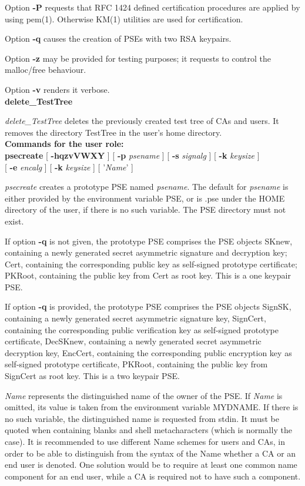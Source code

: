 Option {\bf -P} requests that RFC 1424 defined certification procedures are applied
by using pem(1). Otherwise KM(1) utilities are used for certification.

Option {\bf -q} causes the creation of PSEs with two RSA keypairs.

Option {\bf -z} may be provided for testing purposes; it requests to control the malloc/free behaviour.

Option {\bf -v} renders it verbose. \\ [1em]
{\bf delete\_TestTree}

{\em delete\_TestTree} deletes the previously created test tree of CAs and users. It removes
the directory TestTree in the user's home directory.
\\ [1em] 
{\bf Commands for the user role:} 
\\ [1em]
{\bf psecreate} [ {\bf -hqzvVWXY} ] [ {\bf -p} {\em psename} ]
[ {\bf -s} {\em signalg} ] [ {\bf -k} {\em keysize} ] \\ 
\hspace*{2cm} [ {\bf -e} {\em encalg} ] [ {\bf -k} {\em keysize} ] [ '{\em Name}' ]

{\em psecreate} creates a prototype PSE named {\em psename}. The default for {\em psename} is either
provided by the environment variable PSE, or is .pse under the HOME directory of the user, if there
is no such variable. The PSE directory must not exist.

If option {\bf -q} is not given, the prototype PSE comprises the PSE objects 
\bi
\m SKnew, containing a newly generated secret asymmetric signature and decryption key;
\m Cert, containing the corresponding public key as self-signed prototype certificate;
\m PKRoot, containing the public key from Cert as root key.
\ei
This is a one keypair PSE.
 
If option {\bf -q} is provided, the prototype PSE comprises the PSE objects 
\bi
\m SignSK, containing a newly generated secret asymmetric signature key,
\m SignCert, containing the corresponding public verification key as self-signed prototype certificate,
\m DecSKnew, containing a newly generated secret asymmetric decryption key,
\m EncCert, containing the corresponding public encryption key as self-signed prototype certificate,
\m PKRoot, containing the public key from SignCert as root key.
\ei
This is a two keypair PSE.

{\em Name} represents the distinguished name of the owner of the PSE. 
If {\em Name} is omitted, its value is taken from the environment variable MYDNAME. If there is no
such variable, the distinguished name is requested from 
stdin. 
It must be quoted when containing blanks and shell metacharacters (which is normally the case).
It is recommended to use different Name schemes for users and CAs, in order to be 
able to distinguish from the syntax of the Name whether a CA or an end user is denoted.
One solution would be to require at least one common name component
for an end user, while a CA is required not to have such a component. 
 
